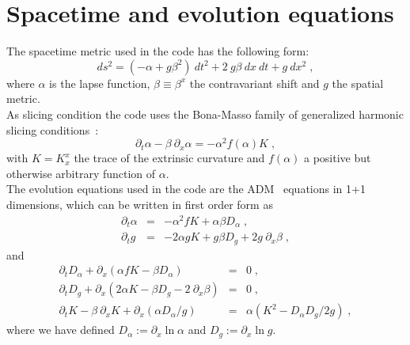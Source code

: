 \documentclass[12pt]{article}
\begin{document}

\setcounter{equation}{0}
\section{Spacetime and evolution equations}

The spacetime metric used in the code has the following form:
\begin{equation}
ds^2 = \left( - \alpha + g \beta^2 \right) \: dt^2
+ 2 \: g \beta \: dx \: dt + g \: dx^2 \; ,
\end{equation}
where $\alpha$ is the lapse function, $\beta \equiv \beta^x$ the
contravariant shift and $g$ the spatial metric.  \\

As slicing condition the code uses the Bona-Masso family of
generalized harmonic slicing conditions~\cite{Bona94b}:
\begin{equation}
\partial_t \alpha - \beta \: \partial_x \alpha = - \alpha^2 f(\alpha) K \; ,
\label{eq:BonaMasso}
\end{equation}
with $K = K_x^x$ the trace of the extrinsic curvature and $f(\alpha)$
a positive but otherwise arbitrary function of $\alpha$. \\

The evolution equations used in the code are the
ADM~\cite{Arnowitt62,York79} equations in 1+1 dimensions, which can be
written in first order form as
\begin{eqnarray}
\partial_t \alpha &=& - \alpha^2 f K + \alpha \beta D_\alpha \; ,
\label{eq:alphadot} \\
\partial_t g &=& - 2 \alpha g K + g \beta D_g  + 2 g \: \partial_x \beta \; ,
\label{eq:gdot}
\end{eqnarray}
and
\begin{eqnarray}
\partial_t D_\alpha  + \partial_x \left( \alpha f K 
- \beta D_\alpha \right) &=& 0 \; ,
\label{weq:Dadot} \\
\partial_t D_g  + \partial_x \left( 2 \alpha K
- \beta D_g - 2 \: \partial_x \beta \right) &=& 0 \; ,
\label{eq:Dgdot} \\
\partial_t K - \beta \: \partial_x K + \partial_x \left( \alpha D_\alpha /g \right)
&=& \alpha \left( K^2 - D_\alpha D_g / 2g \right) \; ,
\label{eq:Kdot}
\end{eqnarray}
where we have defined $D_\alpha := \partial_x \ln{\alpha}$ and
\mbox{$D_g := \partial_x \ln{g}$}. \\
\end{document}
